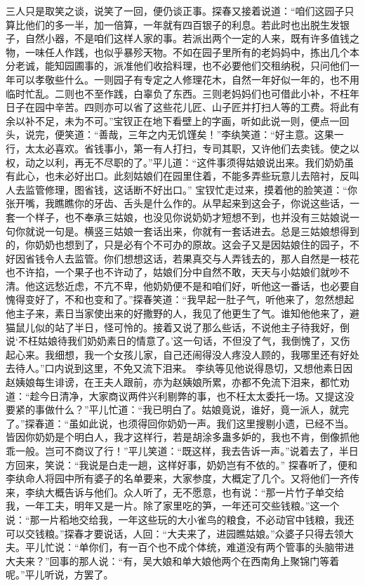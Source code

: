 \documentclass[12pt,oneside]{book}
\begin{document}
三人只是取笑之谈，说笑了一回，便仍谈正事。探春又接着说道：“咱们这园子只算比他们的多一半，加一倍算，一年就有四百银子的利息。若此时也出脱生发银子，自然小器，不是咱们这样人家的事。若派出两个一定的人来，既有许多值钱之物，一味任人作践，也似乎暴殄天物。不如在园子里所有的老妈妈中，拣出几个本分老诚，能知园圃事的，派准他们收拾料理，也不必要他们交租纳税，只问他们一年可以孝敬些什么。一则园子有专定之人修理花木，自然一年好似一年的，也不用临时忙乱。二则也不至作践，白辜负了东西。三则老妈妈们也可借此小补，不枉年日子在园中辛苦。四则亦可以省了这些花儿匠、山子匠并打扫人等的工费。将此有余以补不足，未为不可。”宝钗正在地下看壁上的字画，听如此说一则，便点一回头，说完，便笑道：“善哉，三年之内无饥馑矣！”李纨笑道：“好主意。这果一行，太太必喜欢。省钱事小，第一有人打扫，专司其职，又许他们去卖钱。使之以权，动之以利，再无不尽职的了。”平儿道：“这件事须得姑娘说出来。我们奶奶虽有此心，也未必好出口。此刻姑娘们在园里住着，不能多弄些玩意儿去陪衬，反叫人去监管修理，图省钱，这话断不好出口。”
宝钗忙走过来，摸着他的脸笑道：“你张开嘴，我瞧瞧你的牙齿、舌头是什么作的。从早起来到这会子，你说这些话，一套一个样子，也不奉承三姑娘，也没见你说奶奶才短想不到，也并没有三姑娘说一句你就说一句是。横竖三姑娘一套话出来，你就有一套话进去。总是三姑娘想得到的，你奶奶也想到了，只是必有个不可办的原故。这会子又是因姑娘住的园子，不好因省钱令人去监管。你们想想这话，若果真交与人弄钱去的，那人自然是一枝花也不许掐，一个果子也不许动了，姑娘们分中自然不敢，天天与小姑娘们就吵不清。他这远愁近虑，不亢不卑，他奶奶便不是和咱们好，听他这一番话，也必要自愧得变好了，不和也变和了。”探春笑道：“我早起一肚子气，听他来了，忽然想起他主子来，素日当家使出来的好撒野的人，我见了他更生了气。谁知他他来了，避猫鼠儿似的站了半日，怪可怜的。接着又说了那么些话，不说他主子待我好，倒说‘不枉姑娘待我们奶奶素日的情意了。’这一句话，不但没了气，我倒愧了，又伤起心来。我细想，我一个女孩儿家，自己还闹得没人疼没人顾的，我哪里还有好处去待人。”口内说到这里，不免又流下泪来。
李纨等见他说得恳切，又想他素日因赵姨娘每生诽谤，在王夫人跟前，亦为赵姨娘所累，亦都不免流下泪来，都忙劝道：“趁今日清净，大家商议两件兴利剔弊的事，也不枉太太委托一场。又提这没要紧的事做什么？”平儿忙道：“我已明白了。姑娘竟说，谁好，竟一派人，就完了。”探春道：“虽如此说，也须得回你奶奶一声。我们这里搜剔小遗，已经不当。皆因你奶奶是个明白人，我才这样行，若是胡涂多蛊多妒的，我也不肯，倒像抓他乖一般。岂可不商议了行！”平儿笑道：“既这样，我去告诉一声。”说着去了，半日方回来，笑说：“我说是白走一趟，这样好事，奶奶岂有不依的。”
探春听了，便和李纨命人将园中所有婆子的名单要来，大家参度，大概定了几个。又将他们一齐传来，李纨大概告诉与他们。众人听了，无不愿意，也有说：“那一片竹子单交给我，一年工夫，明年又是一片。除了家里吃的笋，一年还可交些钱粮。”这一个说：“那一片稻地交给我，一年这些玩的大小雀鸟的粮食，不必动官中钱粮，我还可以交钱粮。”探春才要说话，人回：“大夫来了，进园瞧姑娘。”众婆子只得去领大夫。平儿忙说：“单你们，有一百个也不成个体统，难道没有两个管事的头脑带进大夫来？”回事的那人说：“有，吴大娘和单大娘他两个在西南角上聚锦门等着呢。”平儿听说，方罢了。
\end{document}
